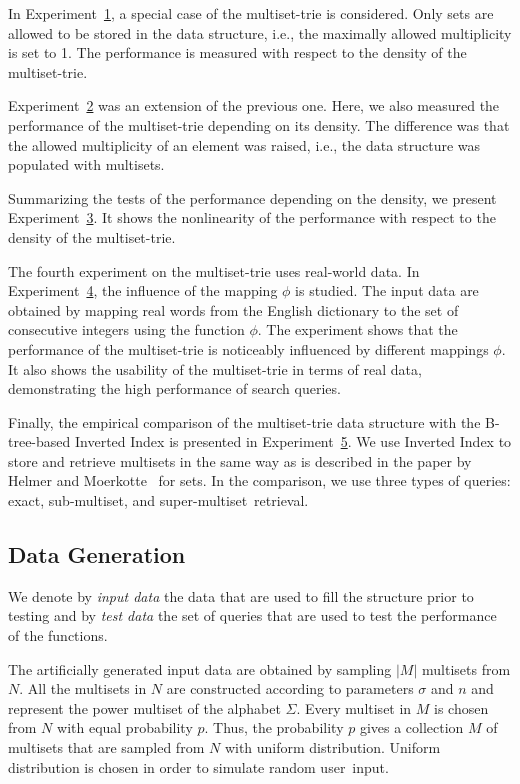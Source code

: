 \documentclass[algorithms,article,accept,pdftex,moreauthors]{Definitions/mdpi}
\begin{document}
In Experiment~\hyperref[s:exp1]{1}, a special case of the multiset-trie is considered. 
Only sets are allowed to be stored in the data structure, i.e., the maximally allowed 
multiplicity is set to 1. The performance is measured with respect to the density 
of the multiset-trie.

Experiment~\hyperref[s:exp2]{2} was an extension of the previous one. Here, 
we also measured the performance of the multiset-trie depending on its density. 
The difference was that the allowed multiplicity of an element was raised, i.e., 
the data structure was populated with multisets. 

Summarizing the tests of the performance depending on the density, we present 
Experiment~\hyperref[s:exp3]{3}. It shows the nonlinearity of the performance 
with respect to the density of the multiset-trie.

The fourth experiment on the multiset-trie uses real-world data. In 
Experiment~\hyperref[s:exp4]{4}, the influence of the mapping $\phi$ is studied. 
The input data are obtained by mapping real words from the English dictionary 
to the set of consecutive integers using the function $\phi.$ The experiment 
shows that the performance of the multiset-trie is noticeably influenced by 
different mappings $\phi.$ It also shows the usability of the multiset-trie in terms 
of real data, demonstrating the high performance of search queries.

Finally, the empirical comparison of the multiset-trie data structure with
the B-tree-based Inverted Index is presented in Experiment~\hyperref[s:exp5]{5}. We use
Inverted Index to store and retrieve multisets in the same way as
is described in the paper by Helmer and Moerkotte~\cite{Helmer2003}
for sets. In the comparison, we use three types of queries: exact,
sub-multiset, and super-multiset~retrieval.

\subsection{Data%
 Generation}
We denote by \emph{input data} the data that are used to fill the structure prior 
to testing and by \emph{test data} the set of queries that are used to test the 
performance of the functions.

The artificially generated input data are obtained by sampling $|M|$ multisets 
from $N.$ All the multisets in $N$ are constructed according to parameters 
$\sigma$ and $n$ and represent the power multiset of the alphabet $\Sigma.$ 
Every multiset in $M$ is chosen from $N$ with equal probability $p.$ Thus, the 
probability $p$ gives a collection $M$ of multisets that are sampled from $N$ 
with uniform distribution. Uniform distribution is chosen in order to simulate
random user~input.
\end{document}
